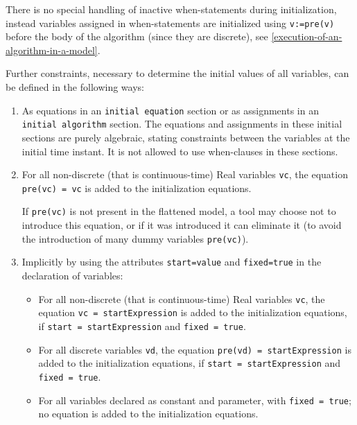 \begin{nonnormative}
There is no special handling of inactive when-statements during initialization, instead
variables assigned in when-statements are initialized using \lstinline!v:=pre(v)!
before the body of the algorithm (since they are discrete), see \autoref{execution-of-an-algorithm-in-a-model}.
\end{nonnormative}

Further constraints, necessary to determine the initial values of all
variables, can be defined in the following ways:
\begin{enumerate}
\item
  As equations in an \lstinline!initial equation! section or as assignments in an
  \lstinline!initial algorithm! section. The equations and assignments in these
  initial sections are purely algebraic, stating constraints between the
  variables at the initial time instant. It is not allowed to use
  when-clauses in these sections.
\item
  For all non-discrete (that is continuous-time) Real variables \lstinline!vc!, the
  equation \lstinline!pre(vc) = vc! is added to the initialization
  equations.
  \begin{nonnormative}
  If \lstinline!pre(vc)! is not present in the flattened model, a tool may choose not to introduce this equation, or if it was introduced
  it can eliminate it (to avoid the introduction of many dummy variables \lstinline!pre(vc)!).
  \end{nonnormative}
\item
  Implicitly by using the attributes \lstinline!start=value! and \lstinline!fixed=true! in the
  declaration of variables:
\begin{itemize}
\item
  For all non-discrete (that is continuous-time) Real variables \lstinline!vc!, the
  equation \lstinline!vc = startExpression! is added to the initialization
  equations, if \lstinline!start = startExpression! and \lstinline!fixed = true!.
\item
  For all discrete variables \lstinline!vd!, the equation \lstinline!pre(vd) = startExpression!
  is added to the initialization equations, if \lstinline!start = startExpression!
  and \lstinline!fixed = true!.
\item
  For all variables declared as constant and parameter, with \lstinline!fixed = true!; no equation is added to the initialization equations.
\end{itemize}
\end{enumerate}

